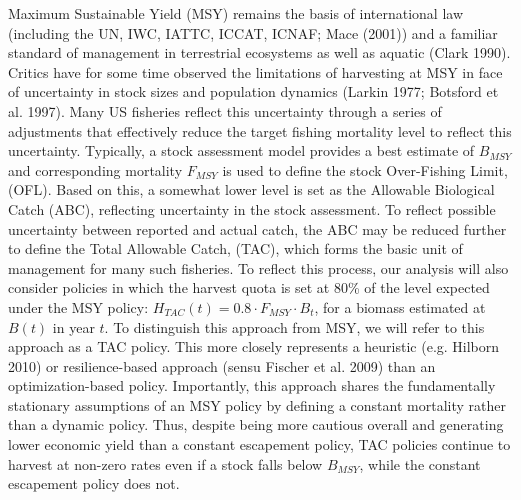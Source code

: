 \documentclass[3p]{elsarticle} %
\begin{document}
Maximum Sustainable Yield (MSY) remains the basis of international law
(including the UN, IWC, IATTC, ICCAT, ICNAF; Mace (2001)) and a familiar
standard of management in terrestrial ecosystems as well as aquatic
(Clark 1990). Critics have for some time observed the limitations of
harvesting at MSY in face of uncertainty in stock sizes and population
dynamics (Larkin 1977; Botsford et al. 1997). Many US fisheries reflect
this uncertainty through a series of adjustments that effectively reduce
the target fishing mortality level to reflect this uncertainty.
Typically, a stock assessment model provides a best estimate of
\(B_{MSY}\) and corresponding mortality \(F_{MSY}\) is used to define
the stock Over-Fishing Limit, (OFL). Based on this, a somewhat lower
level is set as the Allowable Biological Catch (ABC), reflecting
uncertainty in the stock assessment. To reflect possible uncertainty
between reported and actual catch, the ABC may be reduced further to
define the Total Allowable Catch, (TAC), which forms the basic unit of
management for many such fisheries. To reflect this process, our
analysis will also consider policies in which the harvest quota is set
at 80\% of the level expected under the MSY policy:
\(H_{TAC}(t) = 0.8 \cdot F_{MSY} \cdot B_t\), for a biomass estimated at
\(B(t)\) in year \(t\). To distinguish this approach from MSY, we will
refer to this approach as a TAC policy. This more closely represents a
heuristic (e.g. Hilborn 2010) or resilience-based approach (sensu
Fischer et al. 2009) than an optimization-based policy. Importantly,
this approach shares the fundamentally stationary assumptions of an MSY
policy by defining a constant mortality rather than a dynamic policy.
Thus, despite being more cautious overall and generating lower economic
yield than a constant escapement policy, TAC policies continue to
harvest at non-zero rates even if a stock falls below \(B_{MSY}\), while
the constant escapement policy does not.
\end{document}
